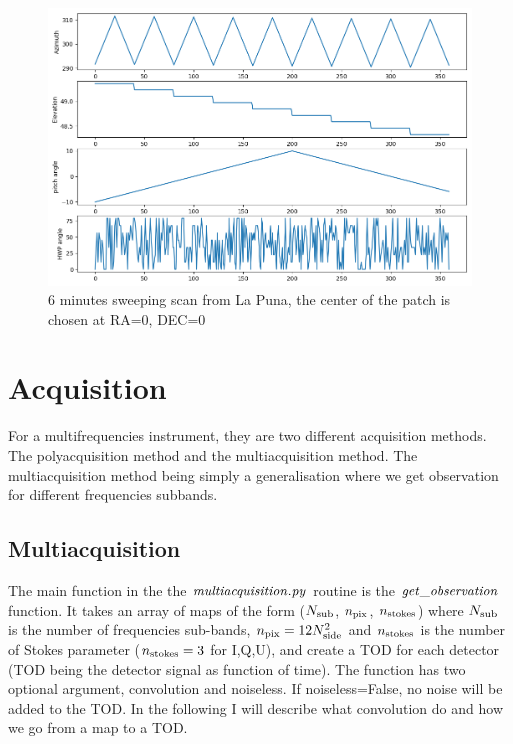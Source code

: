 \documentclass[a4paper, 11pt]{article}
\begin{document}
\begin{figure}
  \centering
  \includegraphics[width=1\textwidth]{sweeping_pointing.png}
  \caption{6 minutes sweeping scan from La Puna, the center of the patch is chosen at RA=0, DEC=0}
  \label{fig:prim_second_beam}
\end{figure}



\section{Acquisition}

For a multifrequencies instrument, they are two different acquisition methods. The polyacquisition method and the multiacquisition method. 
The multiacquisition method being simply a generalisation where we get observation for different frequencies subbands.

\subsection{Multiacquisition}

The main function in the the $\it{multiacquisition.py}$ routine is the $\it{get\_observation}$ function.
It takes an array of maps of the form ($N_{\rm sub}$, $n_{\rm pix}$, $n_{\rm stokes}$) where $N_{\rm sub}$ is the number of frequencies sub-bands, $n_{\rm pix}=12 N^{2}_{\rm side} $ and $n_{\rm stokes}$ is the number of Stokes parameter ($n_{\rm stokes}=3$ for I,Q,U), and create a TOD for each detector (TOD being the detector signal as function of time). The function has two optional argument, convolution and noiseless.
If noiseless=False, no noise will be added to the TOD. In the following I will describe what convolution do and how we go from a map to a TOD.
\end{document}
